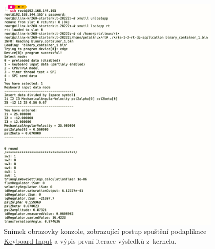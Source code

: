 \documentclass[a4paper, twoside, 11pt]{article}
\newcommand{\fbar}{\FloatBarrier}
\begin{document}
	\begin{figure}[htbp!]
		\centering
		\includegraphics[width=1\textwidth]{src/png/keyboard-input-terminal.png}
		\caption{Snímek obrazovky konzole, zobrazující postup spuštění podaplikace \hyperref[subsec:keyboard-input]{Keyboard Input} a výpis první iterace výsledků z~kernelu.}
		\label{fig:keyboard-input-terminal}
	\end{figure}

		\fbar
\end{document}
